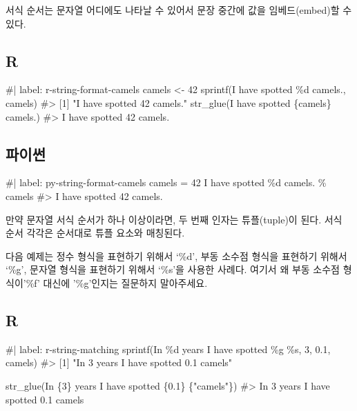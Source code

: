 \documentclass[
  letterpaper,
]{book}
\newenvironment{Shaded}{\begin{snugshade}}{\end{snugshade}}
\newcommand{\NormalTok}[1]{\textcolor[rgb]{0.00,0.23,0.31}{#1}}
\begin{document}
서식 순서는 문자열 어디에도 나타날 수 있어서 문장 중간에 값을
임베드(embed)할 수 있다.

\subsection{R}

\begin{Shaded}
\begin{Highlighting}[]
\NormalTok{\#| label: r{-}string{-}format{-}camels}
\NormalTok{camels \textless{}{-} 42}
\NormalTok{sprintf(\textquotesingle{}I have spotted \%d camels.\textquotesingle{}, camels)}
\NormalTok{\#\textgreater{} [1] "I have spotted 42 camels."}
\NormalTok{str\_glue(\textquotesingle{}I have spotted \{camels\} camels.\textquotesingle{})}
\NormalTok{\#\textgreater{} I have spotted 42 camels.}
\end{Highlighting}
\end{Shaded}

\subsection{파이썬}

\begin{Shaded}
\begin{Highlighting}[]
\NormalTok{\#| label: py{-}string{-}format{-}camels}
\NormalTok{camels = 42}
\NormalTok{\textquotesingle{}I have spotted \%d camels.\textquotesingle{} \% camels}
\NormalTok{\#\textgreater{} \textquotesingle{}I have spotted 42 camels.\textquotesingle{}}
\end{Highlighting}
\end{Shaded}

만약 문자열 서식 순서가 하나 이상이라면, 두 번째 인자는 튜플(tuple)이
된다. 서식 순서 각각은 순서대로 튜플 요소와 매칭된다.

다음 예제는 정수 형식을 표현하기 위해서 `\%d', 부동 소수점 형식을
표현하기 위해서 `\%g', 문자열 형식을 표현하기 위해서 `\%s'을 사용한
사례다. 여기서 왜 부동 소수점 형식이'\%f' 대신에 '\%g'인지는 질문하지
말아주세요.  

\subsection{R}

\begin{Shaded}
\begin{Highlighting}[]
\NormalTok{\#| label: r{-}string{-}matching}
\NormalTok{sprintf(\textquotesingle{}In \%d years I have spotted \%g \%s\textquotesingle{}, 3, 0.1, \textquotesingle{}camels\textquotesingle{})}
\NormalTok{\#\textgreater{} [1] "In 3 years I have spotted 0.1 camels"}

\NormalTok{str\_glue(\textquotesingle{}In \{3\} years I have spotted \{0.1\} \{"camels"\}\textquotesingle{})}
\NormalTok{\#\textgreater{} In 3 years I have spotted 0.1 camels}
\end{Highlighting}
\end{Shaded}
\end{document}
